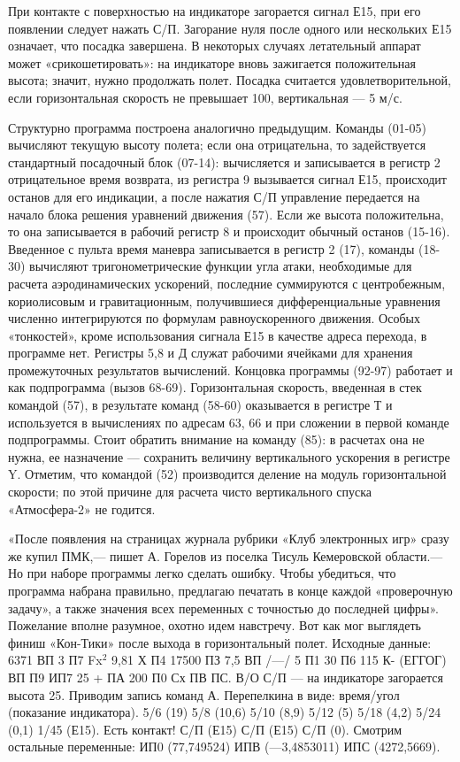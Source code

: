 \documentclass[11pt,a4paper,oneside]{article}
\begin{document}
При контакте с поверхностью на индикаторе загорается сигнал Е15, при его появлении следует нажать С/П. Загорание нуля после одного или нескольких Е15 означает, что посадка завершена. В некоторых случаях летательный аппарат может «срикошетировать»: на индикаторе вновь зажигается положительная высота; значит, нужно продолжать полет. Посадка считается удовлетворительной, если горизонтальная скорость не превышает 100, вертикальная — 5 м/с.

Структурно программа построена аналогично предыдущим. Команды (01-05) вычисляют текущую высоту полета; если она отрицательна, то задействуется стандартный посадочный блок (07-14): вычисляется и записывается в регистр 2 отрицательное время возврата, из регистра 9 вызывается сигнал Е15, происходит останов для его индикации, а после нажатия С/П управление передается на начало блока решения уравнений движения (57). Если же высота положительна, то она записывается в рабочий регистр 8 и происходит обычный останов (15-16). Введенное с пульта время маневра записывается в регистр 2 (17), команды (18-30) вычисляют тригонометрические функции угла атаки, необходимые для расчета аэродинамических ускорений, последние суммируются с центробежным, кориолисовым и гравитационным, получившиеся дифференциальные уравнения численно интегрируются по формулам равноускоренного движения. Особых «тонкостей», кроме использования сигнала Е15 в качестве адреса перехода, в программе нет. Регистры 5,8 и Д служат рабочими ячейками для хранения промежуточных результатов вычислений. Концовка программы (92-97) работает и как подпрограмма (вызов 68-69). Горизонтальная скорость, введенная в стек командой (57), в результате команд (58-60) оказывается в регистре Т и используется в вычислениях по адресам 63, 66 и при сложении в первой команде подпрограммы. Стоит обратить внимание на команду (85): в расчетах она не нужна, ее назначение — сохранить величину вертикального ускорения в регистре Y. Отметим, что командой (52) производится деление на модуль горизонтальной скорости; по этой причине для расчета чисто вертикального спуска «Атмосфера-2» не годится.

«После появления на страницах журнала рубрики «Клуб электронных игр» сразу же купил ПМК,— пишет А. Горелов из поселка Тисуль Кемеровской области.— Но при наборе программы легко сделать ошибку. Чтобы убедиться, что программа набрана правильно, предлагаю печатать в конце каждой «проверочную задачу», а также значения всех переменных с точностью до последней цифры». Пожелание вполне разумное, охотно идем навстречу. Вот как мог выглядеть финиш «Кон-Тики» после выхода в горизонтальный полет. Исходные данные: 6371 ВП 3 П7 Fx$^{2}$ 9,81 Х П4 17500 ПЗ 7,5 ВП /—/ 5 П1 30 П6 115 К- (ЕГГОГ) ВП П9 ИП7 25 + ПА 200 П0 Сх ПВ ПС. В/О С/П — на индикаторе загорается высота 25. Приводим запись команд А. Перепелкина в виде: время/угол (показание индикатора). 5/6 (19) 5/8 (10,6) 5/10 (8,9) 5/12 (5) 5/18 (4,2) 5/24 (0,1) 1/45 (Е15). Есть контакт! С/П (Е15) С/П (Е15) С/П (0). Смотрим остальные переменные: ИП0 (77,749524) ИПВ (—3,4853011) ИПС (4272,5669).
\end{document}
